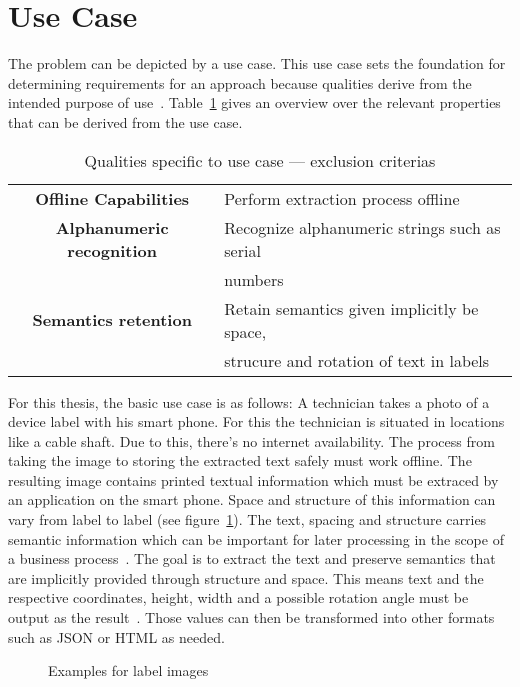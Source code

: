 \section{Use Case}
The problem can be depicted by a use case.
This use case sets the foundation for determining requirements for an
approach because qualities derive from the intended purpose of
use~\citep{siebert_construction_2021}.
Table~\ref{tb:useCaseQualities} gives an overview over the relevant properties that can be derived
from the use case.
\begin{table}[h]\label{tb:useCaseQualities}
    \centering\scriptsize
    \begin{tabular}{c l}
        \textbf{Offline Capabilities} & Perform extraction process offline \\
        \textbf{Alphanumeric recognition}    & Recognize alphanumeric strings such as serial \\
                                    & numbers \\
        \textbf{Semantics retention} & Retain semantics given implicitly be space, \\
                            & strucure and rotation of text in labels \\
    \end{tabular}
    \caption{Qualities specific to use case --- exclusion criterias}
\end{table}
For this thesis, the basic use case is as follows:
A technician takes a photo of a device label with his smart phone.
For this the technician is situated in locations like a cable shaft.
Due to this, there's no internet availability.
The process from taking the image to storing the extracted text safely must work offline.
The resulting image contains printed textual information which must be extraced by an application on
the smart phone.
Space and structure of this information can vary from label to label (see figure~\ref{fig:examples}).
The text, spacing and structure carries semantic information which can be important for later
processing in the scope of a business process~\citep{chen_text_2021}.
The goal is to extract the text and preserve semantics that are implicitly provided through
structure and space.
This means text and the respective coordinates, height, width and a possible rotation angle must
be output as the result~\citep{yang_learning_2021}.
Those values can then be transformed into other formats such as JSON or HTML as needed.
\begin{figure}[h]
    \centering
    \caption{Examples for label images\label{fig:examples}}
\end{figure}
